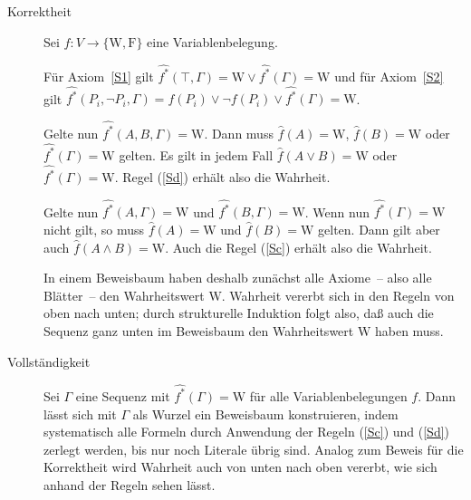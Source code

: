 \begin{beweis}
  \begin{description}
  \item[Korrektheit] Sei $f : V\rightarrow \{ \mathrm{W}, \mathrm{F}\}$ eine
    Variablenbelegung.  

    Für Axiom~\ref{S1} gilt 
    $\widehat{\mbox{$f$}^*}(\top,\Gamma)=\mathrm{W}\vee\widehat{\mbox{$f$}^*}(\Gamma)=\mathrm{W}$ und für Axiom~\ref{S2} gilt $\widehat{\mbox{$f$}^*}(P_i,\neg P_i,\Gamma)=f(P_i)\vee\neg f(P_i)\vee\widehat{\mbox{$f$}^*}(\Gamma)=\mathrm{W}$.
    
    Gelte nun $\widehat{\mbox{$f$}^*}(A, B, \Gamma)=\mathrm{W}$.  Dann muss ${\hat{f}}(A)=\mathrm{W}$,
    ${\hat{f}}(B)=\mathrm{W}$ oder
    $\widehat{\mbox{$f$}^*}(\Gamma)=\mathrm{W}$ gelten.
    Es gilt in jedem Fall
    ${\hat{f}}(A\vee B)=\mathrm{W}$ oder $\widehat{\mbox{$f$}^*}(\Gamma)=\mathrm{W}$.
    Regel (\ref{Sd}) erhält also die Wahrheit.
    
    Gelte nun $\widehat{\mbox{$f$}^*}(A, \Gamma)=\mathrm{W}$ und $\widehat{\mbox{$f$}^*}(B, \Gamma)=\mathrm{W}$.
    Wenn nun $\widehat{\mbox{$f$}^*}(\Gamma)=\mathrm{W}$ nicht gilt, so muss ${\hat{f}}(A)=\mathrm{W}$ und
    ${\hat{f}}(B)=\mathrm{W}$ gelten.  Dann gilt aber auch ${\hat{f}}(A\wedge B)=\mathrm{W}$.
    Auch die Regel (\ref{Sc}) erhält also die Wahrheit.
    
    In einem Beweisbaum haben deshalb zunächst alle Axiome~-- also alle
    Blätter~-- den Wahrheitswert $\mathrm{W}$.  Wahrheit vererbt sich in den Regeln
    von oben nach unten; durch strukturelle Induktion folgt also, daß auch
    die Sequenz ganz unten im Beweisbaum den Wahrheitswert $\mathrm{W}$ haben muss.
  \item[Vollständigkeit] Sei $\Gamma$ eine Sequenz mit
    $\widehat{\mbox{$f$}^*}(\Gamma)=\mathrm{W}$ für alle Variablenbelegungen $f$.
    Dann lässt sich mit $\Gamma$ als Wurzel ein 
    Beweisbaum konstruieren, indem systematisch alle Formeln durch Anwendung
    der Regeln (\ref{Sc}) und (\ref{Sd}) zerlegt werden, bis nur noch Literale
    übrig sind.
    Analog zum Beweis für die Korrektheit wird Wahrheit
    auch von unten nach oben vererbt, wie sich anhand der
    Regeln sehen lässt.
    

\end{description}
\end{beweis}
